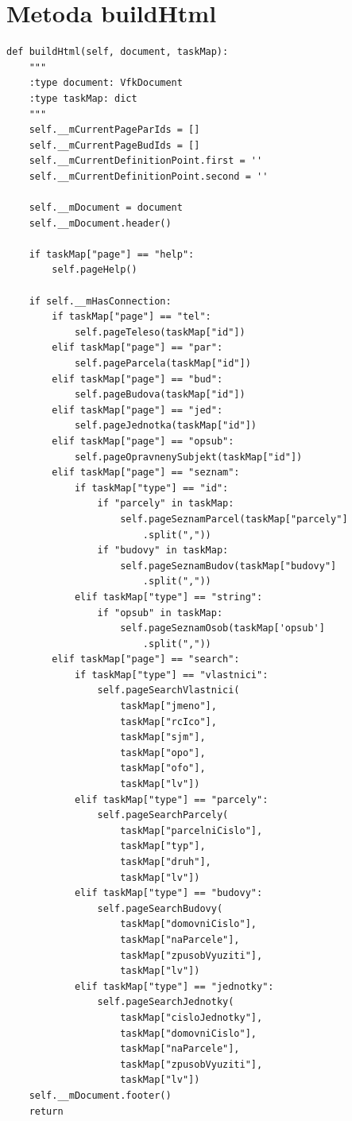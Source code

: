 \documentclass[a4paper,12pt,oneside]{book}
\begin{document}
\section{Metoda buildHtml}

{\scriptsize
\begin{lstlisting}[style=python, label=l_buildHtml]
def buildHtml(self, document, taskMap):
    """
    :type document: VfkDocument
    :type taskMap: dict
    """
    self.__mCurrentPageParIds = []
    self.__mCurrentPageBudIds = []
    self.__mCurrentDefinitionPoint.first = ''
    self.__mCurrentDefinitionPoint.second = ''

    self.__mDocument = document
    self.__mDocument.header()

    if taskMap["page"] == "help":
        self.pageHelp()

    if self.__mHasConnection:
        if taskMap["page"] == "tel":
            self.pageTeleso(taskMap["id"])
        elif taskMap["page"] == "par":
            self.pageParcela(taskMap["id"])
        elif taskMap["page"] == "bud":
            self.pageBudova(taskMap["id"])
        elif taskMap["page"] == "jed":
            self.pageJednotka(taskMap["id"])
        elif taskMap["page"] == "opsub":
            self.pageOpravnenySubjekt(taskMap["id"])
        elif taskMap["page"] == "seznam":
            if taskMap["type"] == "id":
                if "parcely" in taskMap:
                    self.pageSeznamParcel(taskMap["parcely"]
                    	.split(","))
                if "budovy" in taskMap:
                    self.pageSeznamBudov(taskMap["budovy"]
                    	.split(","))
            elif taskMap["type"] == "string":
                if "opsub" in taskMap:
                    self.pageSeznamOsob(taskMap['opsub']
                    	.split(","))
        elif taskMap["page"] == "search":
            if taskMap["type"] == "vlastnici":
                self.pageSearchVlastnici(
                    taskMap["jmeno"], 
                    taskMap["rcIco"],
                    taskMap["sjm"], 
                    taskMap["opo"],
                    taskMap["ofo"], 
                    taskMap["lv"])
            elif taskMap["type"] == "parcely":
                self.pageSearchParcely(
                    taskMap["parcelniCislo"], 
                    taskMap["typ"], 
                    taskMap["druh"], 
                    taskMap["lv"])
            elif taskMap["type"] == "budovy":
                self.pageSearchBudovy(
                    taskMap["domovniCislo"], 
                    taskMap["naParcele"], 
                    taskMap["zpusobVyuziti"],
                    taskMap["lv"])
            elif taskMap["type"] == "jednotky":
                self.pageSearchJednotky(
                    taskMap["cisloJednotky"], 
                    taskMap["domovniCislo"], 
                    taskMap["naParcele"],
                    taskMap["zpusobVyuziti"], 
                    taskMap["lv"])
    self.__mDocument.footer()
    return
\end{lstlisting}
}
\end{document}
